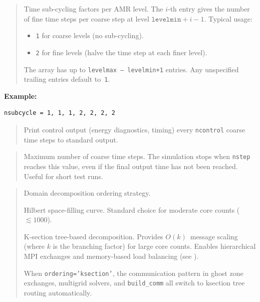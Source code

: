 \label{param:nsubcycle}

\begin{quote}
Time sub-cycling factors per AMR level.  The $i$-th entry gives the
number of fine time steps per coarse step at level
$\texttt{levelmin}+i-1$.  Typical usage:
\begin{itemize}[nosep]
  \item \texttt{1} for coarse levels (no sub-cycling).
  \item \texttt{2} for fine levels (halve the time step at each
        finer level).
\end{itemize}
The array has up to \texttt{levelmax\,--\,levelmin+1} entries.  Any
unspecified trailing entries default to~\texttt{1}.
\end{quote}

\noindent\textcolor{apidefault}{\textsf{\textbf{Example:}}}
\begin{lstlisting}
nsubcycle = 1, 1, 1, 2, 2, 2, 2
\end{lstlisting}

\label{param:ncontrol}

\begin{quote}
Print control output (energy diagnostics, timing) every
\texttt{ncontrol} coarse time steps to standard output.
\end{quote}

\label{param:nstepmax}

\begin{quote}
Maximum number of coarse time steps.  The simulation stops when
\texttt{nstep} reaches this value, even if the final output time has
not been reached.  Useful for short test runs.
\end{quote}

\label{param:ordering}

\begin{quote}
Domain decomposition ordering strategy.
\begin{description}[style=nextline,leftmargin=2.5cm,font=\ttfamily]
  \item[`hilbert'] Hilbert space-filling curve.  Standard choice for
    moderate core counts ($\lesssim 1000$).
  \item[`ksection'] K-section tree-based decomposition.  Provides
    $O(k)$~message scaling (where $k$ is the branching factor) for
    large core counts.  Enables hierarchical MPI exchanges and
    memory-based load balancing (see ).
\end{description}
When \texttt{ordering='ksection'}, the communication pattern in ghost
zone exchanges, multigrid solvers, and \texttt{build\_comm} all switch
to ksection tree routing automatically.
\end{quote}

